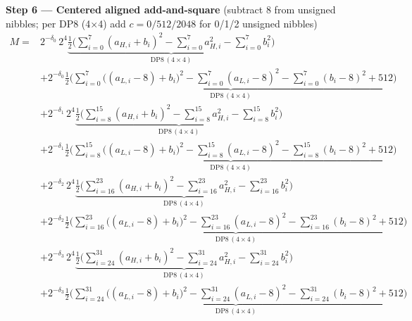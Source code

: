 \documentclass[fleqn]{article}
\newcommand{\DPop}[3]{\mathrm{DP#1}\,(#2\!\times\!#3)}
\begin{document}
\textbf{Step 6 --- Centered aligned add-and-square}\quad
{\small(subtract $8$ from unsigned nibbles; per DP8 (4$\times$4) add $c=0/512/2048$ for 0/1/2 unsigned nibbles)}
{\small
\begin{align*}
M = {}
  & 2^{-\delta_0}\,2^{4}\underbrace{\tfrac12\Big(\sum_{i=0}^{7}(a_{H,i}{+}b_i)^2 - \sum_{i=0}^{7}a_{H,i}^2 - \sum_{i=0}^{7}b_i^2\Big)}_{\DPop{8}{4}{4}} \\[0.15em]
  & + 2^{-\delta_0}\underbrace{\tfrac12\Big(\sum_{i=0}^{7}\big((a_{L,i}{-}8){+}b_i\big)^2 - \sum_{i=0}^{7}(a_{L,i}{-}8)^2 - \sum_{i=0}^{7}(b_i{-}8)^2 + 512\Big)}_{\DPop{8}{4}{4}} \\[0.15em]
  & + 2^{-\delta_1}\,2^{4}\underbrace{\tfrac12\Big(\sum_{i=8}^{15}(a_{H,i}{+}b_i)^2 - \sum_{i=8}^{15}a_{H,i}^2 - \sum_{i=8}^{15}b_i^2\Big)}_{\DPop{8}{4}{4}} \\[0.15em]
  & + 2^{-\delta_1}\underbrace{\tfrac12\Big(\sum_{i=8}^{15}\big((a_{L,i}{-}8){+}b_i\big)^2 - \sum_{i=8}^{15}(a_{L,i}{-}8)^2 - \sum_{i=8}^{15}(b_i{-}8)^2 + 512\Big)}_{\DPop{8}{4}{4}} \\[0.15em]
  & + 2^{-\delta_2}\,2^{4}\underbrace{\tfrac12\Big(\sum_{i=16}^{23}(a_{H,i}{+}b_i)^2 - \sum_{i=16}^{23}a_{H,i}^2 - \sum_{i=16}^{23}b_i^2\Big)}_{\DPop{8}{4}{4}} \\[0.15em]
  & + 2^{-\delta_2}\underbrace{\tfrac12\Big(\sum_{i=16}^{23}\big((a_{L,i}{-}8){+}b_i\big)^2 - \sum_{i=16}^{23}(a_{L,i}{-}8)^2 - \sum_{i=16}^{23}(b_i{-}8)^2 + 512\Big)}_{\DPop{8}{4}{4}} \\[0.15em]
  & + 2^{-\delta_3}\,2^{4}\underbrace{\tfrac12\Big(\sum_{i=24}^{31}(a_{H,i}{+}b_i)^2 - \sum_{i=24}^{31}a_{H,i}^2 - \sum_{i=24}^{31}b_i^2\Big)}_{\DPop{8}{4}{4}} \\[0.15em]
  & + 2^{-\delta_3}\underbrace{\tfrac12\Big(\sum_{i=24}^{31}\big((a_{L,i}{-}8){+}b_i\big)^2 - \sum_{i=24}^{31}(a_{L,i}{-}8)^2 - \sum_{i=24}^{31}(b_i{-}8)^2 + 512\Big)}_{\DPop{8}{4}{4}}
\end{align*}
}
\end{document}
